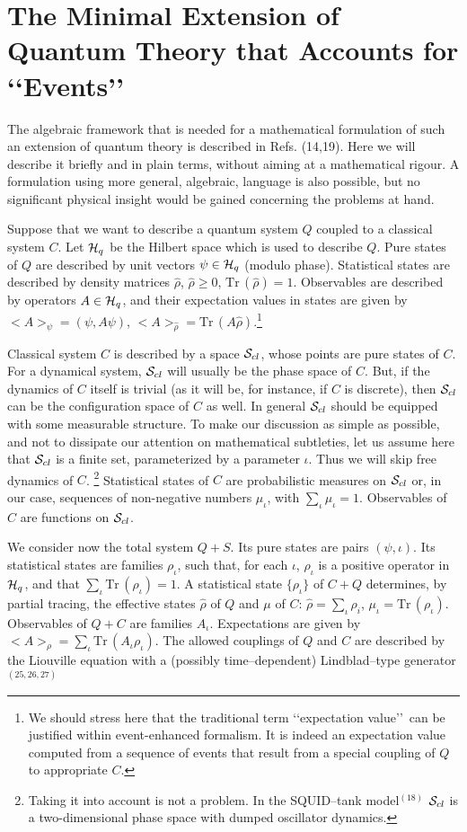 \documentclass[12pt]{article}
\def\hq{{\cal H}_q}
\def\rh{{\hat\rho}}
\def\cs{{\cal S}_{cl}}
\def\tr{\mbox{Tr}\, }
\def\lqq{\lq\lq}
\def\rqq{\rq\rq}
\begin{document}
\section{The Minimal Extension of Quantum Theory that Accounts for
\lqq Events\rqq}
The algebraic framework that is needed for a mathematical formulation of
such an extension of quantum theory is described in Refs. (14,19). Here
we will describe it briefly and in plain terms, without aiming at a
mathematical rigour. A formulation using more general, algebraic,
language is also possible, but no significant physical insight would be
gained concerning the problems at hand.

Suppose that we want to describe a quantum system $Q$ coupled to a
classical system $C$. Let $\hq$ be the Hilbert space which is used to
describe $Q$. Pure states of $Q$ are described by unit vectors
$\psi\in\hq$ (modulo phase). Statistical states are described by density
matrices $\rh$, $\rh\geq 0$, $\tr (\rh )=1$. Observables are described
by operators $A\in\hq$, and their expectation values in states are given
by $<A>_\psi =(\psi,A\psi)$, $<A>_\rh =\tr (A\rh )$.\footnote{We should
stress here that the traditional term \lqq expectation value\rqq\,  can be
justified within event-enhanced formalism. It is indeed an expectation
value computed from a sequence of events that result from a special
coupling of $Q$ to appropriate $C$.}

Classical system $C$ is described by a space $\cs$, whose points are
pure states of $C$. For a dynamical system, $\cs$ will usually be the
phase space of $C$. But, if the dynamics of $C$ itself is trivial (as it
will be, for instance, if $C$ is discrete), then $\cs$ can be the
configuration space of $C$ as well. In general $\cs$ should be equipped
with some measurable structure. To make our discussion as simple as
possible, and not to dissipate our attention on mathematical subtleties,
let us assume here that $\cs$ is a finite set, parameterized by a
parameter $\iota$. Thus we will skip free dynamics of $C$.
\footnote{Taking it into account is not a problem. In the SQUID--tank
model$^{(18)}$ $\cs$ is a two-dimensional phase space with dumped
oscillator dynamics.} Statistical states of $C$ are probabilistic
measures on $\cs$ or, in our case, sequences of non-negative numbers
$\mu_\iota$, with $\sum_\iota\mu_\iota=1$. Observables of $C$ are
functions on $\cs$.

We consider now the total system $Q+S$. Its pure states are pairs
$(\psi,\iota)$. Its statistical states are families $\rho_\iota$, such
that, for each $\iota$, $\rho_\iota$ is a positive operator in $\hq$,
and that $\sum_\iota \tr (\rho _\iota)=1$. A statistical state
$\{\rho_\iota\}$ of $C+Q$ determines, by partial tracing, the effective
states ${\rh}$ of $Q$ and $\mu$ of $C$: $\rh=\sum_\iota\rho_i$,
$\mu_\iota=\tr(\rho_\iota)$. Observables of $Q+C$ are families
$A_\iota$. Expectations are given by $<A>_\rho = \sum_\iota \tr
(A_\iota\rho_\iota)$. The allowed couplings of $Q$ and $C$ are described
by the Liouville equation with a (possibly time--dependent)
Lindblad--type generator$^{(25,26,27)}$
\end{document}
